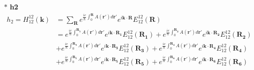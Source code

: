 \documentclass{report}
\begin{document}
\noindent$\ast$ \textbf{h2}
\begin{align*}
	h_2 = H_{12}^{12}(\textbf{k}) & = \sum_{\textbf{R}} e^{\frac{ie}{\hbar}\int_{0}^{\mathbf{R}}A(\mathbf{r'})d\mathbf{r'}}e^{i\mathbf{k\cdot R}} E_{12}^{12}(\mathbf{R})                                                                                                               \\
	                              & = e^{\frac{ie}{\hbar}\int_{0}^{\mathbf{R_1}}A(\mathbf{r'})d\mathbf{r'}}e^{i\mathbf{k\cdot R_1}} E_{12}^{12}(\mathbf{R_1}) + e^{\frac{ie}{\hbar}\int_{0}^{\mathbf{R_2}}A(\mathbf{r'})d\mathbf{r'}}e^{i\mathbf{k\cdot R_2}} E_{12}^{12}(\mathbf{R_2}) \\
	                              & + e^{\frac{ie}{\hbar}\int_{0}^{\mathbf{R_3}}A(\mathbf{r'})d\mathbf{r'}}e^{i\mathbf{k\cdot R_3}} E_{12}^{12}(\mathbf{R_3}) + e^{\frac{ie}{\hbar}\int_{0}^{\mathbf{R_4}}A(\mathbf{r'})d\mathbf{r'}}e^{i\mathbf{k\cdot R_4}} E_{12}^{12}(\mathbf{R_4}) \\
	                              & + e^{\frac{ie}{\hbar}\int_{0}^{\mathbf{R_5}}A(\mathbf{r'})d\mathbf{r'}}e^{i\mathbf{k\cdot R_5}} E_{12}^{12}(\mathbf{R_5}) + e^{\frac{ie}{\hbar}\int_{0}^{\mathbf{R_6}}A(\mathbf{r'})d\mathbf{r'}}e^{i\mathbf{k\cdot R_6}} E_{12}^{12}(\mathbf{R_6})
\end{align*}
\end{document}
